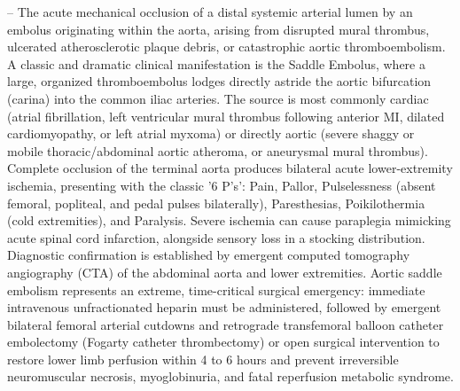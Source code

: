 -- The acute mechanical occlusion of a distal systemic arterial lumen by an embolus originating within the aorta, arising from disrupted mural thrombus, ulcerated atherosclerotic plaque debris, or catastrophic aortic thromboembolism. A classic and dramatic clinical manifestation is the Saddle Embolus, where a large, organized thromboembolus lodges directly astride the aortic bifurcation (carina) into the common iliac arteries. The source is most commonly cardiac (atrial fibrillation, left ventricular mural thrombus following anterior MI, dilated cardiomyopathy, or left atrial myxoma) or directly aortic (severe shaggy or mobile thoracic/abdominal aortic atheroma, or aneurysmal mural thrombus). Complete occlusion of the terminal aorta produces bilateral acute lower-extremity ischemia, presenting with the classic '6 P's': Pain, Pallor, Pulselessness (absent femoral, popliteal, and pedal pulses bilaterally), Paresthesias, Poikilothermia (cold extremities), and Paralysis. Severe ischemia can cause paraplegia mimicking acute spinal cord infarction, alongside sensory loss in a stocking distribution. Diagnostic confirmation is established by emergent computed tomography angiography (CTA) of the abdominal aorta and lower extremities. Aortic saddle embolism represents an extreme, time-critical surgical emergency: immediate intravenous unfractionated heparin must be administered, followed by emergent bilateral femoral arterial cutdowns and retrograde transfemoral balloon catheter embolectomy (Fogarty catheter thrombectomy) or open surgical intervention to restore lower limb perfusion within 4 to 6 hours and prevent irreversible neuromuscular necrosis, myoglobinuria, and fatal reperfusion metabolic syndrome.

